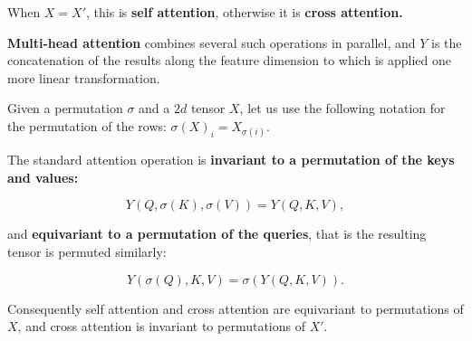 \documentclass[c,8pt]{beamer}
\begin{document}
\begin{frame}{}


\pause

When $X= X'$, this is \textbf{self attention}, \pause otherwise it is
\textbf{cross attention.}

\pause

\textbf{Multi-head attention} combines several such operations in
parallel, and $Y$ is the concatenation of the results along the
feature dimension to which is applied one more linear transformation.



\end{frame}


\begin{frame}[fragile]{}{}

Given a permutation $\sigma$ and a $2d$ tensor $X$, let us use the
following notation for the permutation of the rows: $\sigma(X)_i =
X_{\sigma(i)}$.

The standard attention operation is \textbf{invariant to a permutation
  of the keys and values:}

\[
Y(Q, \sigma(K), \sigma(V)) = Y(Q, K, V),
\]

and \textbf{equivariant to a permutation of the queries}, that is the
resulting tensor is permuted similarly:

\[
Y(\sigma(Q), K, V) = \sigma(Y(Q, K, V)).
\]

\pause

Consequently self attention and cross attention are equivariant to
permutations of $X$, and cross attention is invariant to permutations
of $X'$.

\end{frame}
\end{document}
